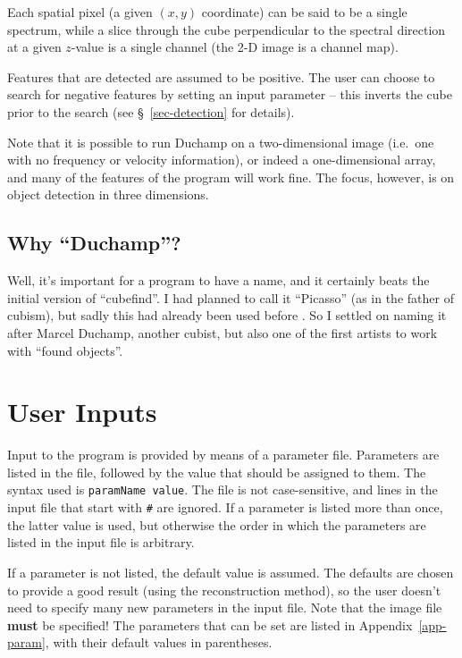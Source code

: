 \documentclass[12pt,a4paper]{article}
\newcommand{\ie}{i.e.\ }
\begin{document}
Each spatial pixel (a given $(x,y)$ coordinate) can be said to be a
single spectrum, while a slice through the cube perpendicular to the
spectral direction at a given $z$-value is a single channel (the 2-D
image is a channel map).

Features that are detected are assumed to be positive. The user can
choose to search for negative features by setting an input parameter
-- this inverts the cube prior to the search (see
\S~\ref{sec-detection} for details).

Note that it is possible to run Duchamp on a two-dimensional image
(\ie one with no frequency or velocity information), or indeed a
one-dimensional array, and many of the features of the program will
work fine. The focus, however, is on object detection in three
dimensions.

\subsection{Why ``Duchamp''?}

Well, it's important for a program to have a name, and it certainly
beats the initial version of ``cubefind''. I had planned to call it
``Picasso'' (as in the father of cubism), but sadly this had already
been used before \citep{minchin99}. So I settled on naming it after
Marcel Duchamp, another cubist, but also one of the first artists to
work with ``found objects''.

\section{User Inputs}
\label{sec-param}

Input to the program is provided by means of a parameter file. Parameters
are listed in the file, followed by the value that should be assigned
to them. The syntax used is {\tt paramName value}. The file is not
case-sensitive, and lines in the input file that start with {\tt \#} are
ignored. If a parameter is listed more than once, the latter value is
used, but otherwise the order in which the parameters are listed in the
input file is arbitrary. 

If a parameter is not listed, the default value is assumed. The
defaults are chosen to provide a good result (using the reconstruction
method), so the user doesn't need to specify many new parameters in
the input file. Note that the image file {\bf must} be specified! The
parameters that can be set are listed in Appendix~\ref{app-param},
with their default values in parentheses.
\end{document}
